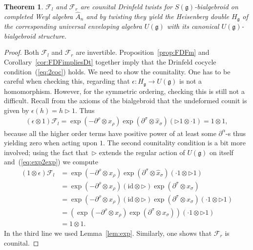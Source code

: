 \documentclass[pdftex]{sigma}
\def\gg{\mathfrak{g}}
\def\hx{\hat{x}}
\def\id{\mathrm{id}}
\newtheorem{Theorem}{Theorem}[section]
\numberwithin{equation}{section}
\begin{document}
\begin{Theorem} \label{th:main}
$\mathcal{F}_l$ and $\mathcal{F}_r$ are
counital Drinfeld twists for $S(\gg)$-bialgebroid
on completed Weyl algebra $\hat{A}_n$ and by twisting
they yield the Heisenberg double $H_\gg$
of the corresponding universal enveloping algebra $U(\gg)$
with its canonical $U(\gg)$-bialgebroid structure.
\end{Theorem}
\begin{proof} Both $\mathcal{F}_l$ and $\mathcal{F}_r$ are invertible.
Proposition~\ref{prop:FDFm} and Corollary~\ref{cor:FDFimpliesDt}
together imply that the Drinfeld cocycle condition~(\ref{eq:2coc}) holds.
We need to show the counitality. One has to be careful when checking this,
regarding that $\epsilon\colon H_\gg\to U(\gg)$ is not a homomorphism.
However, for the symmetric ordering, checking this is still not a difficult.
Recall from the axioms of the bialgebroid
that the undeformed counit is given by $\epsilon(h) = h\triangleright 1$. Thus
\begin{gather*}
(\epsilon\otimes 1)\mathcal{F}_l = \exp(-\partial^\rho\otimes x_\rho)\exp(\partial^\sigma\otimes\hx_\sigma)(\triangleright 1\otimes \cdot 1)
= 1\otimes 1,
\end{gather*}
because all the higher order terms have positive power of at least some $\partial^\alpha$-s thus yielding zero when acting upon $1$.
The second counitality condition is a bit more involved; using the fact that~$\triangleright$ extends the regular action of $U(\gg)$ on itself and~(\ref{eq:exp2exp}) we compute
\begin{align*}
(1\otimes \epsilon)\mathcal{F}_l &=\exp(-\partial^\rho\otimes x_\rho)\exp(\partial^\sigma\otimes\hx_\sigma)(\cdot 1\otimes \triangleright 1)\\
&= \exp(-\partial^\rho\otimes x_\rho)(\id\otimes \triangleright)\exp(\partial^\sigma\otimes x_\sigma)\\
&= \exp(-\partial^\rho\otimes x_\rho)(\id\otimes \triangleright)\exp(\partial^\sigma\otimes x_\sigma)(\cdot 1\otimes \triangleright 1)\\
&=(\exp(-\partial^\rho\otimes x_\rho)\exp(\partial^\sigma\otimes x_\sigma))(\cdot 1\otimes \triangleright 1)\\
&= 1\otimes 1.
\end{align*}
In the third line we used Lemma~\ref{lem:exp}. Similarly, one shows that $\mathcal{F}_r$ is counital.


\end{proof}
\end{document}
